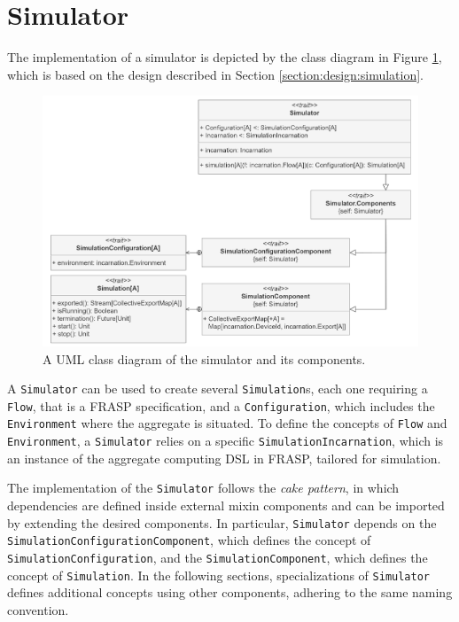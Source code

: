 
\section{Simulator}
\label{section:implementation:simulator}

The implementation of a simulator is depicted by the class diagram in Figure
\ref{figure:simulator-class-diagram}, which is based on the design described in
Section \ref{section:design:simulation}.

\begin{figure}[!ht]
  \centering
  \includegraphics[width=1\textwidth]{resources/figures/diagrams/short/simulator-class-diagram.pdf}
  \caption[A UML class diagram of the simulator]{
    A UML class diagram of the simulator and its components.
  }
  \label{figure:simulator-class-diagram}
\end{figure}

A \texttt{Simulator} can be used to create several \texttt{Simulation}s, each
one requiring a \texttt{Flow}, that is a FRASP specification, and a
\texttt{Configuration}, which includes the \texttt{Environment} where the
aggregate is situated. To define the concepts of \texttt{Flow} and
\texttt{Environment}, a \texttt{Simulator} relies on a specific
\texttt{SimulationIncarnation}, which is an instance of the aggregate computing
\ac{DSL} in FRASP, tailored for simulation.

The implementation of the \texttt{Simulator} follows the \textit{cake pattern},
in which dependencies are defined inside external mixin components and can be
imported by extending the desired components. In particular, \texttt{Simulator}
depends on the \texttt{Simula\-tionConfigurationComponent}, which defines the
concept of \texttt{SimulationConfi\-guration}, and the
\texttt{SimulationCompo\-nent}, which defines the concept of
\texttt{Simula\-tion}. In the following sections, specializations of
\texttt{Simulator} defines additional concepts using other components, adhering
to the same naming convention.

